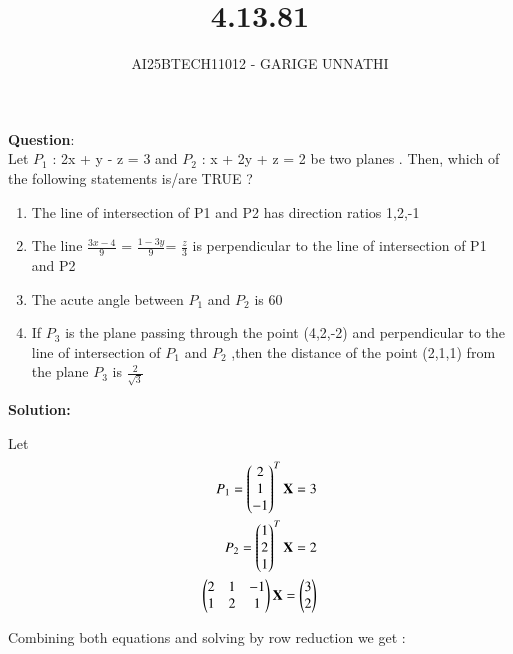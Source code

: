 \documentclass[journal]{IEEEtran}
\begin{document}



\title{4.13.81}
\author{AI25BTECH11012 - GARIGE UNNATHI}
{\let\newpage\relax\maketitle}


\renewcommand{\thefigure}{\theenumi}
\renewcommand{\thetable}{\theenumi}
\setlength{\intextsep}{10pt} %



\vspace{-1cm}

\textbf{Question}:\\
Let $P_1$ : 2x + y - z = 3 and $P_2$ : x + 2y + z = 2 be two planes . Then, which of the following statements is/are TRUE ?
\begin{enumerate}
    \item The line of intersection of P1 and P2 has direction ratios 1,2,-1
    \item The line $\frac{3x-4}{9}$ = $\frac{1-3y}{9} $= $\frac{z}{3}$ is perpendicular to the line of intersection of P1 and P2
    \item The acute angle between $P_1$ and $P_2$ is 60\degree
    \item If $P_3$ is the plane passing through the point (4,2,-2) and perpendicular to the line of intersection of $P_1$ and $P_2$ ,then the distance of the point (2,1,1) from the plane $P_3$ is $\frac{2}{\sqrt{3}}$
\end{enumerate}
\textbf{Solution: }

Let 
\begin{align}
    P_1 = \begin{pmatrix}2\\1\\-1\end{pmatrix}^{T}\mathbf{X} = 3 \\
    P_2 = \begin{pmatrix}1\\2\\1\end{pmatrix}^{T}\mathbf{X} = 2\\
    \begin{pmatrix}2 &1 &-1\\1&2&1\end{pmatrix}\mathbf{X} = \begin{pmatrix}3\\2\end{pmatrix}
\end{align}

Combining both equations and solving by row reduction we get :
\end{document}
